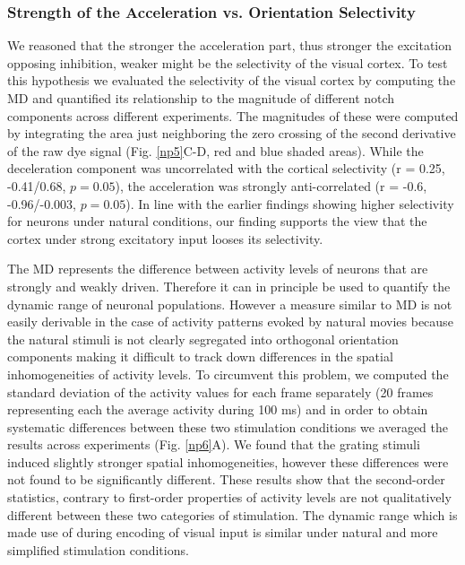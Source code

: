 \subsubsection{Strength of the Acceleration vs. Orientation Selectivity }

We reasoned that the stronger the acceleration part, thus stronger the
excitation opposing inhibition, weaker might be the selectivity of the
visual cortex. To test this hypothesis we evaluated the selectivity of the
visual cortex by computing the MD and quantified its relationship to the
magnitude of different notch components across different experiments. The
magnitudes of these were computed by integrating the area just neighboring
the zero crossing of the second derivative of the raw dye signal (Fig.
\ref{np5}C-D, red and blue shaded areas). While the deceleration component
was uncorrelated with the cortical selectivity (r = 0.25, -0.41/0.68, $p =
0.05$), the acceleration was strongly anti-correlated (r = -0.6,
-0.96/-0.003, $p = 0.05$). In line with the earlier findings showing higher
selectivity for neurons under natural conditions, our finding supports the
view that the cortex under strong excitatory input looses its selectivity.

The MD represents the difference between activity levels of neurons that
are strongly and weakly driven. Therefore it can in principle be used to
quantify the dynamic range of neuronal populations. However a measure
similar to MD is not easily derivable in the case of activity patterns
evoked by natural movies because the natural stimuli is not clearly
segregated into orthogonal orientation components making it difficult to
track down differences in the spatial inhomogeneities of activity levels.
To circumvent this problem, we computed the standard deviation of the
activity values for each frame separately (20 frames representing each the
average activity during 100 ms) and in order to obtain systematic
differences between these two stimulation conditions we averaged the
results across experiments (Fig. \ref{np6}A). We found that the grating stimuli
induced slightly stronger spatial inhomogeneities, however these
differences were not found to be significantly different. These results
show that the second-order statistics, contrary to first-order properties
of activity levels are not qualitatively different between these two
categories of stimulation. The dynamic range which is made use of during
encoding of visual input is similar under natural and more simplified
stimulation conditions.



